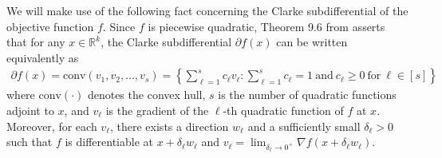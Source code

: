 \documentclass[11pt]{article}
\renewcommand{\epsilon}{\varepsilon}
\newcommand{\R}{\mathbb{R}}
\newcommand{\G}{G}
\newtheorem{lem}{Lemma}
\theoremstyle{remark}
\begin{document}
We will make use of the following fact concerning the Clarke subdifferential of the objective function $f$. Since $f$ is piecewise quadratic, Theorem 9.6 from \cite{Clason2017} asserts that for any $x \in \R^k$, the Clarke subdifferential $\partial f(x)$ can be written equivalently as \begin{align}
    \partial f(x) = \text{conv}(v_1,v_2,\dots,v_{s}) = \left\{\sum_{\ell=1}^s c_{\ell}v_{\ell} :  \sum_{\ell=1}^s c_{\ell} = 1\ \text{and}\ c_{\ell} \geqslant 0\ \text{for}\ \ell \in [s]\right\} \label{subdifferential_definition}
\end{align} where $\text{conv}(\cdot) $ denotes the convex hull, $s$ is the number of quadratic functions adjoint to $x$, and $v_{\ell}$ is the gradient of the $\ell$-th quadratic function of $f$ at $x$. Moreover, for each $v_{\ell}$, there exists a direction $w_{\ell}$ and a sufficiently small $\delta_{\ell} > 0$ such that $f$ is differentiable at $x + \delta_{\ell} w_{\ell}$ and $v_{\ell} = \lim_{\delta_{\ell} \rightarrow 0^+} \nabla f(x + \delta_{\ell}w_{\ell})$.



\end{document}
